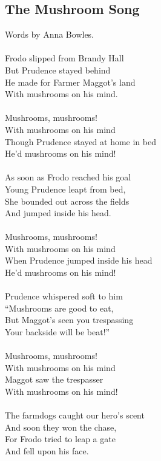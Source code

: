 \begin{multicols}{2}
\section{The Mushroom Song}
Words by Anna Bowles.
\\
\\
Frodo slipped from Brandy Hall
\\
But Prudence stayed behind
\\
He made for Farmer Maggot’s land
\\
With mushrooms on his mind.
\\
\\
Mushrooms, mushrooms!
\\
With mushrooms on his mind
\\
Though Prudence stayed at home in bed
\\
He’d mushrooms on his mind!
\\
\\
As soon as Frodo reached his goal
\\
Young Prudence leapt from bed,
\\
She bounded out across the fields
\\
And jumped inside his head.
\\
\\
Mushrooms, mushrooms!
\\
With mushrooms on his mind
\\
When Prudence jumped inside his head
\\
He’d mushrooms on his mind!
\\
\\
Prudence whispered soft to him
\\
“Mushrooms are good to eat,
\\
But Maggot’s seen you trespassing
\\
Your backside will be beat!”
\\
\\
Mushrooms, mushrooms!
\\
With mushrooms on his mind
\\
Maggot saw the trespasser
\\
With mushrooms on his mind!
\\
\\
The farmdogs caught our hero’s scent
\\
And soon they won the chase,
\\
For Frodo tried to leap a gate
\\
And fell upon his face.
\\

\end{multicols}
